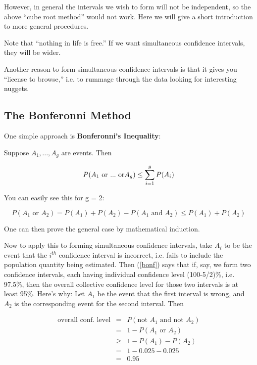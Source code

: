 However, in general the intervals we wish to form will not be
independent, so the above ``cube root method'' would not work.  Here we
will give a short introduction to more general procedures.

Note that ``nothing in life is free.''  If we want simultaneous
confidence intervals, they will be wider.

Another reason to form simultaneous confidence intervals is that it
gives you  ``license to browse,'' i.e. to rummage through the data
looking for interesting nuggets.

\subsection{The Bonferonni Method}

One simple approach is {\bf Bonferonni's Inequality}:

\begin{lemma}
Suppose $A_1,...,A_g$ are events.  Then

\begin{equation}
\label{bonf}
P(A_1 {\rm ~or~...~or} A_g) \leq \sum_{i=1}^{g} P(A_i)
\end{equation}

\end{lemma}

You can easily see this for g = 2: 

\begin{equation}
P(A_1 \textrm{ or } A_2) = P(A_1) + P(A_2) - P(A_1 \textrm{ and } A_2)
\leq  P(A_1) + P(A_2)
\end{equation}

One can then prove the general case by mathematical induction.

Now to apply this to forming simultaneous confidence intervals, take
$A_i$ to be the event that the $i^{th}$ confidence interval is
incorrect, i.e. fails to include the population quantity being
estimated.  Then (\ref{bonf}) says that if, say, we form two confidence
intervals, each having individual confidence level (100-5/2)\%, i.e.
97.5\%, then the overall collective confidence level for those two
intervals is at least 95\%.  Here's why:
Let $A_1$ be the event that the first interval is wrong, and $A_2$ is
the corresponding event for the second interval.  Then

\begin{eqnarray}
\textrm{overall conf. level} &=& P(\textrm{not } A_1 \textrm{ and not } A_2) \\ 
&=& 1 - P(A_1 \textrm{ or } A_2) \\
&\geq&  1 - P(A_1) - P(A_2) \\
&=& 1 - 0.025 - 0.025 \\
&=& 0.95
\end{eqnarray}

